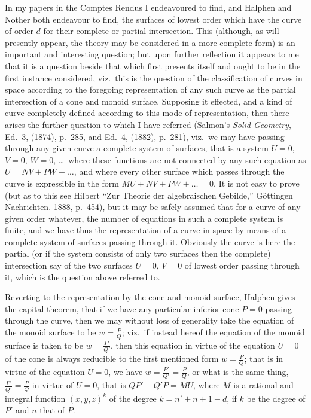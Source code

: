 \documentclass[12pt,a4paper]{article}
\theoremstyle{plain}
\begin{document}
In my papers in the Comptes Rendus I endeavoured to find, and Halphen and Nother both endeavour to find, the surfaces of lowest order which have the curve of order $d$ for their complete or partial intersection. This (although, as will presently appear, the theory may be considered in a more complete form) is an important and interesting question; but upon further reflection it appears to me that it is a question beside that which first presents itself and ought to be in the first instance considered, viz.~this is the question of the classification of curves in space according to the foregoing representation of any such curve as the partial intersection of a cone and monoid surface. Supposing it effected, and a kind of curve completely defined according to this mode of representation, then there arises the further question to which I have referred (Salmon's \textit{Solid Geometry}, Ed.~3, (1874), p.~285, and Ed.~4, (1882), p.~281), viz.~we may have passing through any given curve a complete system of surfaces, that is a system $U=0$, $V=0$, $W=0$, \ldots\ where these functions are not connected by any such equation as $U=NV+PW+\ldots$, and where every other surface which passes through the curve is expressible in the form $MU+NV+PW+\ldots=0$. It is not easy to prove (but as to this see Hilbert ``Zur Theorie der algebraischen Gebilde,'' G\"{o}ttingen Nachrichten. 1888, p.~454), but it may be safely assumed that for a curve of any given order whatever, the number of equations in such a complete system is finite, and we have thus the representation of a curve in space by means of a complete system of surfaces passing through it. Obviously the curve is here the partial (or if the system consists of only two surfaces then the complete) intersection say of the two surfaces $U=0$, $V=0$ of lowest order passing through it, which is the question above referred to.

Reverting to the representation by the cone and monoid surface, Halphen gives the capital theorem, that if we have any particular inferior cone $P=0$ passing through the curve, then we may without loss of generality take the equation of the monoid surface to be $w=\frac{P}{Q}$; viz.~if instead hereof the equation of the monoid surface is taken to be $w=\frac{P'}{Q'}$, then this equation in virtue of the equation $U=0$ of the cone is always reducible to the first mentioned form $w=\frac{P}{Q}$; that is in virtue of the equation $U=0$, we have $w=\frac{P'}{Q'}=\frac{P}{Q}$, or what is the same thing, $\frac{P'}{Q'}=\frac{P}{Q}$ in virtue of $U=0$, that is $QP'-Q'P=MU$, where $M$ is a rational and integral function $(x,y,z)^k$ of the degree $k=n'+n+1-d$, if $k$ be the degree of $P'$ and $n$ that of $P$.
\end{document}
